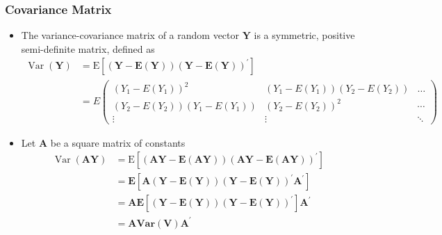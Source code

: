 \documentclass[11pt]{article}
\begin{document}
\subsubsection{Covariance Matrix}
\begin{itemize}
    \item The variance-covariance matrix of a random vector $\mathbf{Y}$ is a symmetric, positive semi-definite matrix, defined as
    \begin{align*}
        \operatorname{Var}(\mathbf{Y}) 
        &= \mathrm{E}\left[(\mathbf{Y}-\mathbf{E}(\mathbf{Y}))(\mathbf{Y}-\mathbf{E}(\mathbf{Y}))^{\prime}\right] \\
        &= E\left(
            \begin{array}{ccc}
                {\left(Y_{1}-E\left(Y_{1}\right)\right)^{2}} & {\left(Y_{1}-E\left(Y_{1}\right)\right)\left(Y_{2}-E\left(Y_{2}\right)\right)} & {\ldots} \\ {\left(Y_{2}-E\left(Y_{2}\right)\right)\left(Y_{1}-E\left(Y_{1}\right)\right)} & {\left(Y_{2}-E\left(Y_{2}\right)\right)^{2}} & {\cdots} \\ {\vdots} & {\vdots} & {\ddots}
            \end{array}
        \right)
    \end{align*}
    \item Let $\mathbf{A}$ be a square matrix of constants
        \begin{align*}
            \operatorname{Var}(\mathbf{A Y}) 
            &=\mathrm{E}\left[(\mathbf{A} \mathbf{Y}-\mathbf{E}(\mathbf{A} \mathbf{Y}))(\mathbf{A} \mathbf{Y}-\mathbf{E}(\mathbf{A} \mathbf{Y}))^{\prime}\right] \\ 
            &=\mathbf{E}\left[\mathbf{A}(\mathbf{Y}-\mathbf{E}(\mathbf{Y}))(\mathbf{Y}-\mathbf{E}(\mathbf{Y}))^{\prime} \mathbf{A}^{\prime}\right] \\ 
            &=\mathbf{A} \mathbf{E}\left[(\mathbf{Y}-\mathbf{E}(\mathbf{Y}))(\mathbf{Y}-\mathbf{E}(\mathbf{Y}))^{\prime}\right] \mathbf{A}^{\prime} \\ 
            &=\mathbf{A} \mathbf{V} \mathbf{a r}(\mathbf{V}) \mathbf{A}^{\prime}
        \end{align*}
\end{itemize}
\end{document}
